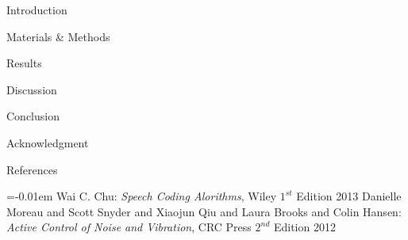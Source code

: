 \documentclass[a0paper,landscape,40pt]{baposter}
\begin{document}
\begin{poster}
\begin{posterbox}[name=intro,column=0,span=1,row=0,height=0.5]{Introduction}

\end{posterbox}

\begin{posterbox}[name=Materials,column=0,below=intro, above=bottom]{Materials \& Methods}

\end{posterbox}

\begin{posterbox}[name=Results,column=1,row=0,height=0.88,span=2]{Results}

\end{posterbox}

\begin{posterbox}[name=discussion,column=3,row=0,height=0.5]{Discussion}

\end{posterbox}

\begin{posterbox}[name=conclusion,column=3,below=discussion]{Conclusion}
	
\end{posterbox}

\begin{posterbox}[name=Acks,column=3,below=conclusion,above=bottom,,height=0.1]{Acknowledgment}
	
\end{posterbox}


\begin{posterbox}[name=refs,column=1,span=2,above=bottom]{References}

\begin{thebibliography}{1}%
\itemsep=-0.01em%
\setlength{\baselineskip}{0.4em}%
 Wai C. Chu: \emph{Speech Coding Alorithms}, Wiley $1^{st}$ Edition 2013
 Danielle Moreau and Scott Snyder and Xiaojun Qiu and Laura Brooks and Colin Hansen: \emph{Active Control of Noise and Vibration}, CRC Press $2^{nd}$ Edition 2012
\end{thebibliography}
\end{posterbox}



\end{poster}
\end{document}

